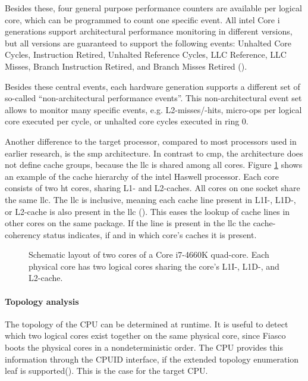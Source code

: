 Besides these, four general purpose performance counters are available per
logical core, which can be programmed to count one specific event.
All \gls{intel} Core i generations support architectural performance monitoring
in different versions, but all versions are guaranteed to support the following
events:
Unhalted Core Cycles, Instruction Retired, Unhalted Reference Cycles,
LLC Reference, LLC Misses, Branch Instruction Retired,
and Branch Misses Retired (\cite{intel_arch_ref_manual_2015}).

Besides these central events, each hardware generation supports a different set
of so-called ``non-architectural performance events''.
This non-architectural event set allows to monitor many specific events, e.g.
L2-misses/-hits, micro-ops per logical core executed per cycle, or unhalted
core cycles executed in ring 0.

Another difference to the target processor, compared to most processors used in
earlier research, is the \gls{smp} architecture.
In contrast to \gls{cmp}, the architecture does not define cache groups,
because the \gls{llc} is shared among all cores.
Figure \ref{state:fig:core_layout} shows an example of the cache hierarchy of
the \gls{intel} Haswell processor.
Each core consists of two \gls{ht} cores, sharing L1- and L2-caches.
All cores on one socket share the same \gls{llc}.
The \gls{llc} is inclusive, meaning each cache line present in L1I-, L1D-, or
L2-cache is also present in the \gls{llc}
(\cite[2-23]{intel_optimization_manual_2015}).
This eases the lookup of cache lines in other cores on the same package.
If the line is present in the \gls{llc} the cache-coherency status indicates,
if and in which core's caches it is present.


\begin{figure}[h!]
  \setcapindent*{1em}
  \begin{captionbeside}[]{Schematic layout of two cores of a Core i7-4660K quad-core.
    Each physical core has two logical cores sharing the core's L1I-,
    L1D-, and L2-cache.}
  
\end{captionbeside}
  \label{state:fig:core_layout}
\end{figure}

\paragraph{Topology analysis}
The topology of the CPU can be determined at runtime.
It is useful to detect which two logical cores exist together on the same
physical core, since Fiasco boots the physical cores in a nondeterministic order.
The CPU provides this information through the CPUID interface, if the
extended topology enumeration leaf is supported(\cite[Vol.2A
3-179]{intel_arch_ref_manual_2015}). This is the case for the
target CPU.

